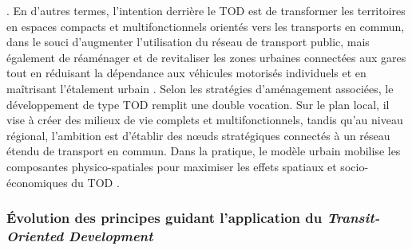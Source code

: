 \begin{refsegment}
{} \textcolor{blue}{\autocite[56]{calthorpe_next_1993}}. En d'autres termes, l'intention derrière le \acrshort{TOD} est de transformer les territoires en espaces compacts et multifonctionnels orientés vers les transports en commun, dans le souci d'augmenter l'utilisation du réseau de transport public, mais également de réaménager et de revitaliser les zones urbaines connectées aux gares tout en réduisant la dépendance aux véhicules motorisés individuels et en maîtrisant l'étalement urbain \textcolor{blue}{\autocites[19]{carlton_histories_2007}[7]{tcrp_effects_2008}[112]{almeida_correia_transit-oriented_2020}}. Selon les stratégies d’aménagement associées, le développement de type \acrshort{TOD} remplit une double vocation. Sur le plan local, il vise à créer des milieux de vie complets et multifonctionnels, tandis qu'au niveau régional, l'ambition est d’établir des nœuds stratégiques connectés à un réseau étendu de transport en commun. Dans la pratique, le modèle urbain mobilise les composantes physico-spatiales pour maximiser les effets spatiaux et socio-économiques du \acrshort{TOD} \textcolor{blue}{\autocite[39]{conesa_modelisation_2010}}.%

\subsubsection*{Évolution des principes guidant l'application du \textsl{Transit-Oriented Development}
    \label{chap1:tod-presentation-generale-definition-principes}
    }


\end{refsegment}
